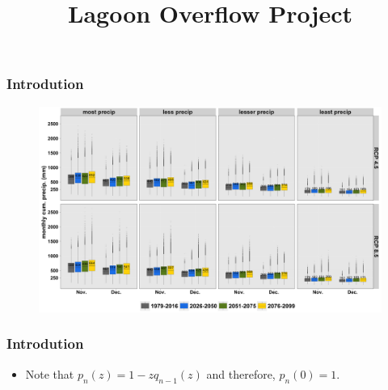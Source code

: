 \documentclass[mathserif]{beamer}
\title{ Lagoon Overflow Project}
\author{}
\date{}
\begin{document}
\maketitle

\begin{frame}
 \frametitle{Introdution}
{\vspace*{.010mm}}

\begin{figure}[httb!]
\centering
  \includegraphics[width=1\linewidth]{figures/nov_Dec_box}
\end{figure}
\end{frame}


\begin{frame}
 \frametitle{Introdution}
\begin{itemize}[<+->]

\item Note that $p_n(z)=1-zq_{n-1}(z)$ and therefore, $p_n(0)=1.$

\end{itemize}
\end{frame}
\end{document}
